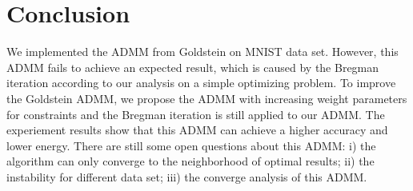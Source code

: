 \documentclass[letterpaper, 10 pt, conference]{ieeeconf}  %
\begin{document}
\section{Conclusion} \label{conclusion}
We implemented the ADMM from Goldstein on MNIST data set. However, this ADMM fails to achieve an expected result, which is caused by the Bregman iteration according to our analysis on a simple optimizing problem. To improve the Goldstein ADMM, we propose the ADMM with increasing weight parameters for constraints and the Bregman iteration is still applied to our ADMM. The experiement results show that this ADMM can achieve a higher accuracy and lower energy. There are still some open questions about this ADMM: i) the algorithm can only converge to the neighborhood of optimal results; ii) the instability for different data set; iii) the converge analysis of this ADMM.

\balance

\end{document}
